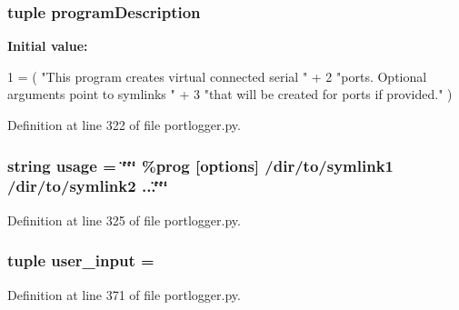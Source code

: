 \subsubsection[{program\+Description}]{\setlength{\rightskip}{0pt plus 5cm}tuple program\+Description}\label{namespaceprotolibs_1_1portlogger_a932eefea0a57c44c6549b33210919c82}
{\bfseries Initial value\+:}
\begin{DoxyCode}
1 = ( \textcolor{stringliteral}{"This program creates virtual connected serial "} +
2                             \textcolor{stringliteral}{"ports. Optional arguments point to symlinks "} +
3                             \textcolor{stringliteral}{"that will be created for ports  if provided."} )
\end{DoxyCode}


Definition at line 322 of file portlogger.\+py.

\subsubsection[{usage}]{\setlength{\rightskip}{0pt plus 5cm}string usage = \char`\"{}\char`\"{}\char`\"{} \%prog [{\bf options}] /dir/{\bf to}/symlink1 /dir/{\bf to}/symlink2 ...\char`\"{}\char`\"{}\char`\"{}}\label{namespaceprotolibs_1_1portlogger_a61e5f066c879e5430d8f713c2c3a8b31}


Definition at line 325 of file portlogger.\+py.

\subsubsection[{user\+\_\+input}]{\setlength{\rightskip}{0pt plus 5cm}tuple user\+\_\+input = \textquotesingle{}\textquotesingle{}}\label{namespaceprotolibs_1_1portlogger_ac7ec21ade52bdc84ce10c687be07482b}


Definition at line 371 of file portlogger.\+py.

